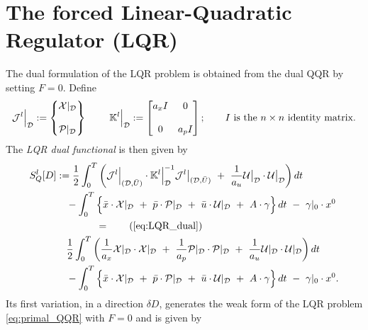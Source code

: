 \documentclass[11pt]{article}
\newcommand{\K}{\mathbb{K}}
\newcommand{\half}{\frac{1}{2}}
\newcommand{\calP}{{\cal P}}
\newcommand{\calU}{{\cal U}}
\newcommand{\calX}{{\cal X}}
\newcommand{\dee}{\mathcal{D}}
\begin{document}
\section{The forced Linear-Quadratic Regulator (LQR)}\label{sec:LQR}
The dual formulation of the LQR problem is obtained from the dual QQR by setting $F = 0$. Define
\begin{equation*}
    \mathcal{J}^l \Big|_\dee : = \begin{Bmatrix} \calX|_\dee  \\ \\ \calP|_\dee  \end{Bmatrix} \; \qquad \K^l \Big|_\dee := \begin{bmatrix} a_x I & 0  \\
                                                                  &   \\
                                                                  0 & a_p I \end{bmatrix}; \qquad I \mbox{ is the } n \times n \mbox{ identity matrix}.\notag\\
\end{equation*}
The \emph{LQR dual functional} is then given by
\begin{subequations}
    \label{eq:LQR_dual}
    \begin{align}
        S_Q^l[D] & := \half \int_0^T \bigg( \mathcal{J}^l \Big|_{(\dee,\bar{U})} \cdot \K^l \Big|_\dee^{-1} \mathcal{J}^l \big|_{(\dee,\bar{U})} \ + \ \frac{1}{a_u} \calU \big|_\dee \cdot \calU \big|_\dee \bigg) \, dt \notag \\
        & \quad - \int_0^T \Big\{ \bar{x} \cdot \calX |_\dee  \ + \ \bar{p} \cdot \calP |_\dee  \ + \ \bar{u} \cdot \calU |_\dee \ + \ A \cdot \gamma \Big\} \, dt \ - \  \gamma|_0 \cdot x^0 \notag \\
        & \qquad \qquad = \tag{\ref{eq:LQR_dual}}\\
        & \quad \half \int_0^T \bigg( \frac{1}{a_x} \calX |_\dee \cdot \calX |_\dee \ + \ \frac{1}{a_p} \calP |_\dee \cdot \calP |_\dee \ + \  \frac{1}{a_u} \calU |_\dee \cdot \calU |_\dee \bigg) \, dt  \notag\\
        & \quad - \int_0^T \Big\{ \bar{x} \cdot \calX |_\dee  \ + \ \bar{p} \cdot \calP |_\dee  \ + \ \bar{u} \cdot \calU |_\dee \ + \ A \cdot \gamma \Big\} \, dt \ - \  \gamma|_0 \cdot x^0. \notag
    \end{align}
\end{subequations}
Its first variation, in a direction $\delta D$,  generates the weak form of the LQR problem \eqref{eq:primal_QQR} with $F = 0$ and is given by
\end{document}
